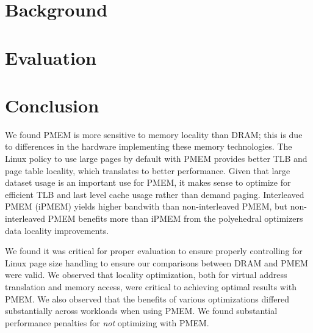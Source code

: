 \documentclass[10pt,journal,compsoc]{IEEEtran}
\begin{document}
\maketitle


\IEEEdisplaynontitleabstractindextext
\IEEEpeerreviewmaketitle


\balance



\section{Background}\label{sec:methodology}


\section{Evaluation}\label{sec:evaluation}



\section{Conclusion}

We found PMEM is more sensitive to memory locality than DRAM; this is due to differences in the hardware implementing these memory technologies.  The Linux policy to use large pages by default with PMEM provides better TLB and page table locality, which translates to better performance.  Given that large dataset usage is an important use for PMEM, it makes sense to optimize for efficient TLB and last level cache usage rather than demand paging.  Interleaved PMEM (iPMEM) yields higher bandwith than non-interleaved PMEM, but non-interleaved PMEM benefits more than iPMEM from the polyehedral optimizers data locality improvements.

We found it was critical for proper evaluation to ensure properly controlling for Linux page size handling to ensure our comparisons between DRAM and PMEM were valid. We observed that locality optimization, both for virtual address translation and memory access, were critical to achieving optimal results with PMEM.  We also observed that the benefits of various optimizations differed substantially across workloads when using PMEM. We found substantial performance penalties for \textit{not} optimizing with PMEM.
\end{document}
